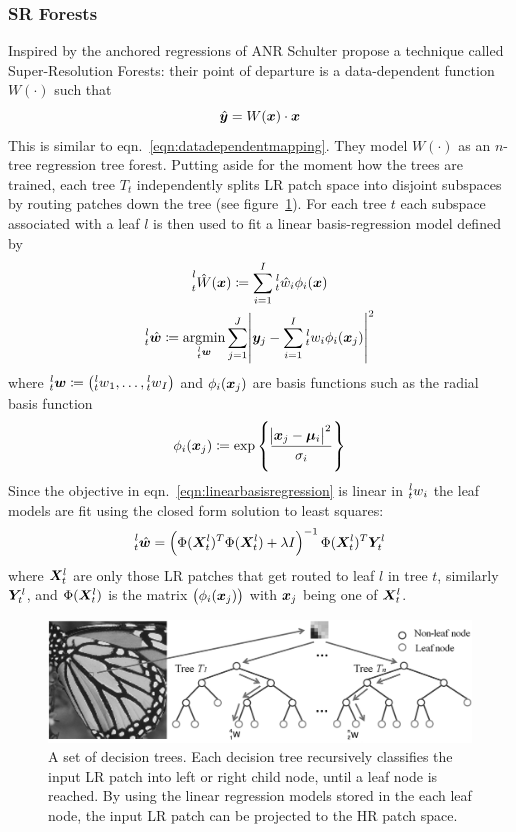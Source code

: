 \subsubsection{SR Forests}
Inspired by the anchored regressions of ANR Schulter \etal\cite{Schulter2015} propose a technique called Super-Resolution Forests: their point of departure is a data-dependent function \(W(\cdot)\) such that
\begin{equation}
	\hat{\bm{y}} = W(\bm{x}) \cdot \bm{x}
\end{equation}
This is similar to eqn.~\eqref{eqn:datadependentmapping}.
%
They model \(W(\cdot)\) as an \(n\)-tree regression tree forest.
%
Putting aside for the moment how the trees are trained, each tree \(T_t\) independently splits LR patch space into disjoint subspaces by routing patches down the tree (see figure~\ref{fig:firf}).
%
For each tree \(t\) each subspace associated with a leaf \(l\) is then used to fit a linear basis-regression model defined by
\begin{gather}
	\prescript{l}{t}{\hat{W}(\bx)} \coloneqq \sum_{i=1}^I \prescript{l}{t}{\hat{w}_i}\phi_i(\bx) \\
	\prescript{l}{t}{\hat{\bm{w}}} \coloneqq \underset{\prescript{l}{t}{\bm{w}}}{\text{argmin}} \sum_{j=1}^J \abs{ \by_j - \sum_{i=1}^I \prescript{l}{t}{w_i}\phi_i(\bx_j) }^2
	\label{eqn:linearbasisregression}
\end{gather}
where \(\prescript{l}{t}{\bm{w}} \coloneqq \left( \prescript{l}{t}{w}_1, \mathellipsis, \prescript{l}{t}{w}_I \right)\) and \(\phi_i(\bm{x}_j)\) are basis functions such as the radial basis function
\begin{equation}
	\phi_i(\bm{x}_j) \coloneqq \exp \left\{ \frac{\abs{ \bm{x}_j - \bm{\mu}_i }^2}{\sigma_i} \right\}
\end{equation}
Since the objective in eqn.~\eqref{eqn:linearbasisregression} is linear in \(\prescript{l}{t}{w}_i\) the leaf models are fit using the closed form solution to least squares:
\begin{equation}
	\prescript{l}{t}{\hat{\bm{w}}} = \left( \Phi(\bm{X}_t^l)^T \Phi(\bm{X}_t^l) + \lambda I \right)^{-1} \Phi(\bm{X}_t^l)^T \bm{Y}_t^l
\end{equation}
where \(\bm{X}_t^l\) are only those LR patches that get routed to leaf \(l\) in tree \(t\), similarly \(\bm{Y}_t^l\), and \(\Phi(\bm{X}_t^l)\) is the matrix \(\left( \phi_i(\bm{x}_j) \right)\) with \(\bm{x}_j\) being one of \(\bm{X}_t^l\).
%
\begin{figure}
	\centering
	\includegraphics[width=\linewidth,keepaspectratio]{figures/classical/FIRF.png}
	\caption{A set of decision trees. Each decision tree recursively classifies the input LR patch into left or right child node, until a leaf node is reached. By using the linear regression models stored in the each leaf node, the input LR patch can be projected to the HR patch space\cite{Huang}.}
	\label{fig:firf}
\end{figure}
